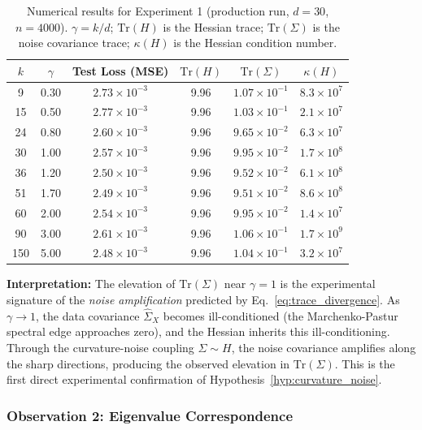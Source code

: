 \documentclass[
  journal=largetwo,
  simfonts=false,
  year=2025,
  volume=37,
]{cup-journal}
\begin{document}
\begin{table}[htb]
\centering
\footnotesize
\caption{Numerical results for Experiment 1 (production run, $d=30$, $n=4000$). $\gamma = k/d$; $\mathrm{Tr}(H)$ is the Hessian trace; $\mathrm{Tr}(\Sigma)$ is the noise covariance trace; $\kappa(H)$ is the Hessian condition number.}
\label{tab:exp1_data}
\begin{tabular}{ cccccc }
\toprule
$k$ & $\gamma$ & Test Loss (MSE) & $\mathrm{Tr}(H)$ & $\mathrm{Tr}(\Sigma)$ & $\kappa(H)$ \\
\midrule
9  & 0.30 & $2.73 \times 10^{-3}$ & 9.96 & $1.07 \times 10^{-1}$ & $8.3 \times 10^{7}$ \\
15 & 0.50 & $2.77 \times 10^{-3}$ & 9.96 & $1.03 \times 10^{-1}$ & $2.1 \times 10^{7}$ \\
24 & 0.80 & $2.60 \times 10^{-3}$ & 9.96 & $9.65 \times 10^{-2}$ & $6.3 \times 10^{7}$ \\
30 & 1.00 & $2.57 \times 10^{-3}$ & 9.96 & $9.95 \times 10^{-2}$ & $1.7 \times 10^{8}$ \\
36 & 1.20 & $2.50 \times 10^{-3}$ & 9.96 & $9.52 \times 10^{-2}$ & $6.1 \times 10^{8}$ \\
51 & 1.70 & $2.49 \times 10^{-3}$ & 9.96 & $9.51 \times 10^{-2}$ & $8.6 \times 10^{8}$ \\
60 & 2.00 & $2.54 \times 10^{-3}$ & 9.96 & $9.95 \times 10^{-2}$ & $1.4 \times 10^{7}$ \\
90 & 3.00 & $2.61 \times 10^{-3}$ & 9.96 & $1.06 \times 10^{-1}$ & $1.7 \times 10^{9}$ \\
150& 5.00 & $2.48 \times 10^{-3}$ & 9.96 & $1.04 \times 10^{-1}$ & $3.2 \times 10^{7}$ \\
\bottomrule
\end{tabular}
\end{table}

\textbf{Interpretation:} The elevation of $\mathrm{Tr}(\Sigma)$ near $\gamma = 1$ is the experimental signature of the \textit{noise amplification} predicted by Eq.~\eqref{eq:trace_divergence}. As $\gamma \to 1$, the data covariance $\hat{\Sigma}_X$ becomes ill-conditioned (the Marchenko-Pastur spectral edge approaches zero), and the Hessian inherits this ill-conditioning. Through the curvature-noise coupling $\Sigma \sim H$, the noise covariance amplifies along the sharp directions, producing the observed elevation in $\mathrm{Tr}(\Sigma)$. This is the first direct experimental confirmation of Hypothesis~\ref{hyp:curvature_noise}.

\subsubsection{Observation 2: Eigenvalue Correspondence}
\end{document}
